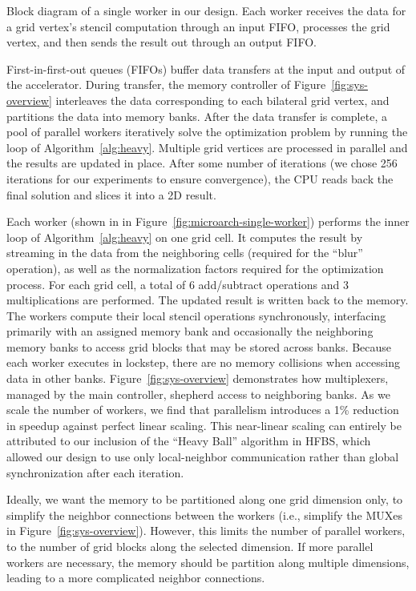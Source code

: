 \begin{marginfigure}
\caption{Block diagram of a single worker in our design.
Each worker receives the data for a grid vertex's stencil computation through an input FIFO, processes the grid vertex, and then sends the result out through an output FIFO.
}
\label{fig:microarch-single-worker}

\end{marginfigure}

First-in-first-out queues (FIFOs) buffer data transfers at the input and output of the accelerator.
During transfer, the memory controller of Figure~\ref{fig:sys-overview} interleaves the data corresponding to each bilateral grid vertex, and partitions the data into memory banks.
After the data transfer is complete, a pool of parallel workers iteratively solve the optimization problem by running the loop of Algorithm~\ref{alg:heavy}.
Multiple grid vertices are processed in parallel and the results are updated in place.
After some number of iterations (we chose 256 iterations for our experiments to ensure convergence), the CPU reads back the final solution and slices it into a 2D result.


Each worker (shown in in Figure~\ref{fig:microarch-single-worker}) performs the inner loop of Algorithm~\ref{alg:heavy} on one grid cell.
It computes the result by streaming in the data from the neighboring cells (required for the ``blur'' operation), as well as the normalization factors required for the optimization process.
For each grid cell, a total of 6 add/subtract operations and 3 multiplications are performed. The updated result is written back to the memory.
The workers compute their local stencil operations synchronously, interfacing primarily with an assigned memory bank and occasionally the neighboring memory banks to access grid blocks that may be stored across banks.
Because each worker executes in lockstep, there are no memory collisions when accessing data in other banks.
Figure~\ref{fig:sys-overview} demonstrates how multiplexers, managed by the main controller, shepherd access to neighboring banks.
As we scale the number of workers, we find that parallelism introduces a 1\% reduction in speedup against perfect linear scaling.
This near-linear scaling can entirely be attributed to our inclusion of the ``Heavy Ball'' algorithm in HFBS, which allowed our design to use only local-neighbor communication rather than global synchronization after each iteration.


Ideally, we want the memory to be partitioned along one grid dimension only, to simplify the neighbor connections between the workers (i.e., simplify the MUXes in Figure~\ref{fig:sys-overview}).
However, this limits the number of parallel workers, to the number of grid blocks along the selected dimension.
If more parallel workers are necessary, the memory should be partition along multiple dimensions, leading to a more complicated neighbor connections.



